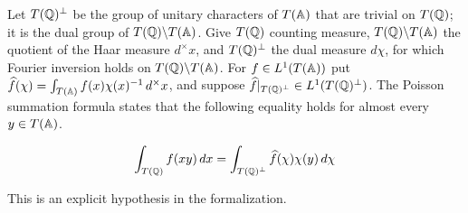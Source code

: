 \begin{equationnode}

\label{eqn:poissonae}


\leanok

Let $T(\QQ)^\perp$ be the group of unitary characters of $T(\AA)$ that are trivial on $T(\QQ)$; it is the dual group of $T(\QQ)\backslash T(\AA)$. Give $T(\QQ)$ counting measure, $T(\QQ)\backslash T(\AA)$ the quotient of the Haar measure $d^\times x$, and $T(\QQ)^\perp$ the dual measure $d\chi$, for which Fourier inversion holds on $T(\QQ)\backslash T(\AA)$. For $f\in L^1(T(\AA))$ put $\widehat f(\chi)=\int_{T(\AA)}f(x)\chi(x)^{-1}\,d^\times x$, and suppose $\widehat f|_{T(\QQ)^\perp}\in L^1(T(\QQ)^\perp)$. The Poisson summation formula \cite[Theorem~4.42]{MR1397028} states that the following equality holds for almost every $y\in T(\AA)$.

\begin{equation*} \int_{T(\QQ)} f(xy)\, dx = \int_{T(\QQ)^\perp} \widehat{f}(\chi) \chi(y) \,d\chi \end{equation*}

\end{equationnode}

This is an explicit hypothesis in the formalization.

